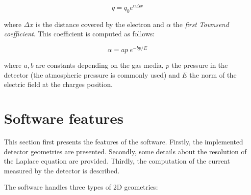 \documentclass[11pt]{article}
\begin{document}
\[q = q_0 e^{\alpha \Delta x}\]

where $\Delta x$ is the distance covered by the electron and $\alpha$ the
\textit{first Townsend coefficient}. This coefficient is computed as follows:

\[\alpha = ap \ e^{-bp/E}\]

where $a, b$ are constants depending on the gas media, $p$ the pressure in
the detector (the atmospheric pressure is commonly used) and $E$ the norm
of the electric field at the charges position.

\section{Software features}

This section first presents the features of the software. Firstly,
the implemented detector geometries are presented. Secondly, some details
about the resolution of the Laplace equation are provided. Thirdly, the
computation of the current measured by the detector is described.

The software handles three types of 2D geometries:
\end{document}
